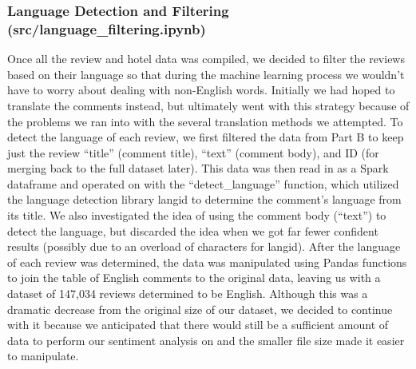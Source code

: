 \documentclass[conference]{IEEEtran}
\begin{document}
	\subsubsection{Language Detection and Filtering (src/language\_filtering.ipynb)}
	Once all the review and hotel data was compiled, we decided to filter the reviews based on their language so that during the machine learning process we wouldn’t have to worry about dealing with non-English words. Initially we had hoped to translate the comments instead, but ultimately went with this strategy because of the problems we ran into with the several translation methods we attempted.
	To detect the language of each review, we first filtered the data from Part B to keep just the review “title” (comment title), “text” (comment body), and ID (for merging back to the full dataset later). This data was then read in as a Spark dataframe and operated on with the “detect\_language” function, which utilized the language detection library langid to determine the comment’s language from its title. We also investigated the idea of using the comment body (“text”) to detect the language, but discarded the idea when we got far fewer confident results (possibly due to an overload of characters for langid). 
	After the language of each review was determined, the data was manipulated using Pandas functions to join the table of English comments to the original data, leaving us with a dataset of 147,034 reviews determined to be English. Although this was a dramatic decrease from the original size of our dataset, we decided to continue with it because we anticipated that there would still be a sufficient amount of data to perform our sentiment analysis on and the smaller file size made it easier to manipulate.
	
\end{document}
